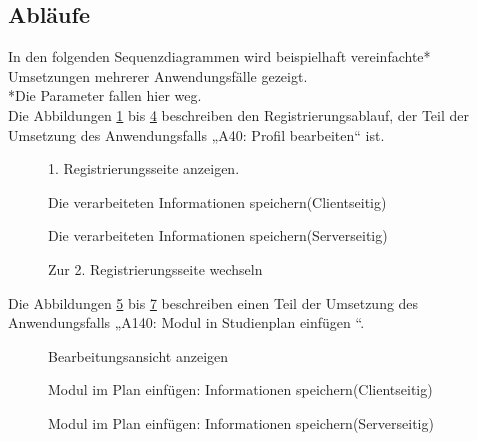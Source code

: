 \subsection{Abläufe}

In den folgenden Sequenzdiagrammen wird beispielhaft vereinfachte* Umsetzungen mehrerer Anwendungsfälle gezeigt.\\
*Die Parameter fallen hier weg.\\

Die Abbildungen \ref{seq:register_1} bis \ref{seq:register_4} beschreiben den Registrierungsablauf, der Teil der Umsetzung des Anwendungsfalls „A40: Profil bearbeiten“ ist.

\begin{figure}[H]
	
	\caption{1. Registrierungsseite anzeigen.}
	\label{seq:register_1}
\end{figure}

\begin{figure}[H]
	
	\caption{Die verarbeiteten Informationen speichern(Clientseitig)}
	\label{seq:register_2}
\end{figure}

\begin{figure}[H]
	
	\caption{Die verarbeiteten Informationen speichern(Serverseitig)}
	\label{seq:register_3}
\end{figure}

\begin{figure}[H]
	
	\caption{Zur 2. Registrierungsseite wechseln}
	\label{seq:register_4}
\end{figure}

Die Abbildungen \ref{seq:addmodul_1} bis \ref{seq:addmodul_3} beschreiben einen Teil der Umsetzung des Anwendungsfalls „A140: Modul in Studienplan einfügen “.

\begin{figure}[H]
	
	\caption{Bearbeitungsansicht anzeigen}
	\label{seq:addmodul_1}
\end{figure}

\begin{figure}[H]
	
	\caption{Modul im Plan einfügen: Informationen speichern(Clientseitig)}
	\label{seq:addmodul_2}
\end{figure}

\begin{figure}[H]
	
	\caption{Modul im Plan einfügen: Informationen speichern(Serverseitig)}
	\label{seq:addmodul_3}
\end{figure}

